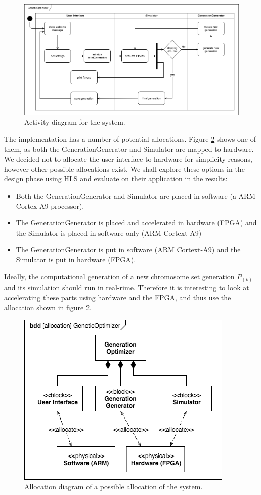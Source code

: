 \begin{figure}[h!]
	\centering
	\includegraphics[width=0.9\linewidth]{../diagrams/overallActivity.png}
	\caption{Activity diagram for the system.}
	\label{fig:activity}
\end{figure}

The implementation has a number of potential allocations. Figure \ref{fig:allocation} shows one of them, as both the GenerationGenerator and Simulator are mapped to hardware. We decided not to allocate the user interface to hardware for simplicity reasons, however other possible allocations exist. We shall explore these options in the design phase using HLS and evaluate on their application in the results:

\begin{itemize} 
	\item Both the GenerationGenerator and Simulator are placed in software (a ARM Cortex-A9 processor).
	\item The GenerationGenerator is placed and accelerated in hardware (FPGA) and the Simulator is placed in software only (ARM Cortext-A9)
	\item The GenerationGenerator is put in software (ARM Cortext-A9) and the Simulator is put in hardware (FPGA).
\end{itemize}

Ideally, the computational generation of a new chromosome set generation $P_{(k)}$ and its simulation should run in real-rime. Therefore it is interesting to look at accelerating these parts using hardware and the FPGA, and thus use the allocation shown in figure \ref{fig:allocation}.

\begin{figure}[h!]
	\centering
	\includegraphics[width=0.6\linewidth]{../diagrams/allocation.png}
	\caption{Allocation diagram of a possible allocation of the system.}
	\label{fig:allocation}
\end{figure}

